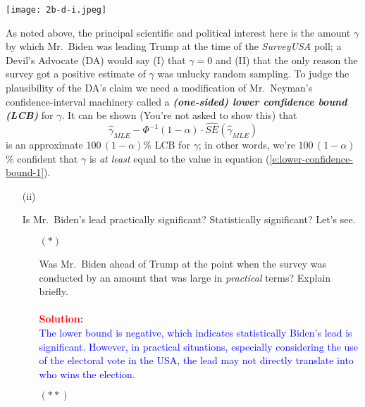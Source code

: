 \documentclass[12pt]{article}
\newcommand{\bi}[1]{\b{\i{#1}}}
\renewcommand{\b}[1]{\textbf{#1}}
\renewcommand{\i}[1]{\textit{#1}}
\begin{document}
\begin{itemize}
\begin{itemize}
\begin{itemize}
\begin{itemize}
\end{itemize}
\textit{\fbox{\textbf{[10 points]}}} \vspace*{0.1in}

\texttt{[image: 2b-d-i.jpeg]}

\end{itemize}

As noted above, the principal scientific and political interest here is the amount $\gamma$ by which Mr.~Biden was leading Trump at the time of the \textit{SurveyUSA} poll; a Devil's Advocate (DA) would say (I) that $\gamma = 0$ and (II) that the only reason the survey got a positive estimate of $\gamma$ was unlucky random sampling. To judge the plausibility of the DA's claim we need a modification of Mr.~Neyman's confidence-interval machinery called a \bi{(one-sided) lower confidence bound (LCB)} for $\gamma$. It can be shown (You're not asked to show this) that
\begin{equation} \label{e:lower-confidence-bound-1}
\hat{ \gamma }_{ MLE } - \Phi^{ -1 } ( 1 - \alpha ) \cdot \widehat{ SE } \left( \hat{ \gamma }_{ MLE } \right)
\end{equation}
is an approximate $100 \, ( 1 - \alpha )$\% LCB for $\gamma$; in other words, we're $100 \, ( 1 - \alpha )$\% confident that $\gamma$ is \textit{at least} equal to the value in equation (\ref{e:lower-confidence-bound-1}).

\begin{itemize}

\item[(ii)]

Is Mr.~Biden's lead practically significant? Statistically significant? Let's see.

\begin{itemize}

\item[$(*)$]

Was Mr.~Biden ahead of Trump at the point when the survey was conducted by an amount that was large in \textit{practical} terms? Explain briefly. \fbox{\bi{[10 points]}} \\ \\ 
 \textcolor{red}{\textbf{Solution:}} \\
\textcolor{blue}{The lower bound is negative, which indicates statistically Biden's lead is significant. However, in practical situations, especially considering the use of the electoral vote in the USA, the lead may not directly translate into who wins the election.
}
\item[$(**)$]


\end{itemize}
\end{itemize}
\end{itemize}
\end{itemize}
\end{document}
